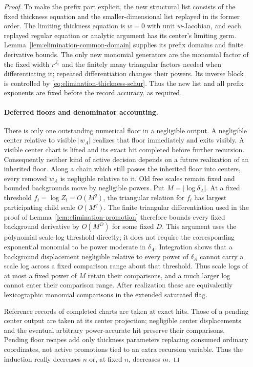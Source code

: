 \begin{proof}
To make the prefix part explicit, the new structural list consists
of the fixed thickness equation and the smaller-dimensional list
replayed in its former order.  The limiting thickness equation is
$w=0$ with unit $w$-Jacobian, and each replayed regular equation or
analytic argument has its center's limiting germ.
Lemma~\ref{lem:elimination-common-domain} supplies its prefix
domains and finite derivative bounds.  The only new monomial
generators are the monomial factor of the fixed width $r^{J_0}$ and
the finitely many triangular factors needed when differentiating it; repeated
differentiation changes their powers.  Its inverse block is
controlled by \eqref{eq:elimination-thickness-schur}.
Thus the new list and all prefix exponents are fixed before the
record accuracy, as required.

\paragraph{Deferred floors and denominator accounting.}
There is only one outstanding numerical floor in a negligible
output.  A negligible center relative to visible $|w_A|$ realizes
that floor immediately and exits visibly.  A visible center chart
is lifted and its exact hit completed before further recursion.
Consequently neither kind of active decision depends on a future
realization of an inherited floor.  Along a chain which still passes
the inherited floor into centers, every removed $w_A$ is negligible
relative to it.  Old free scales remain fixed and bounded backgrounds
move by negligible powers.  Put $M=|\log\delta_A|$.  At a fixed
threshold $f_i=\log Z_i=O(M^q)$, the triangular relation for $f_i$
has largest participating child scale $O(M^q)$.  The finite triangular
differentiation used in the proof of
Lemma~\ref{lem:elimination-promotion} therefore bounds every fixed
background derivative by $O(M^D)$ for some fixed $D$.  This argument
uses the polynomial scale-log threshold directly; it does not require
the corresponding exponential monomial to be power moderate in
$\delta_A$.  Integration shows that a background displacement
negligible relative to every power of $\delta_A$ cannot carry a scale
log across a fixed comparison range about that threshold.  Thus scale
logs of at most a fixed power of $M$ retain their comparisons, and a
much larger log cannot enter their comparison range.  After realization
these are equivalently lexicographic monomial comparisons in the
extended saturated flag.

Reference records of completed charts are taken at exact hits.
Those of a pending center output are taken at its center projection;
negligible center displacements and the eventual arbitrary
power-accurate hit preserve their comparisons.  Pending floor
recipes add only thickness parameters replacing consumed ordinary
coordinates, not active promotions tied to an extra recursion
variable.  Thus the induction really decreases $n$ or, at fixed $n$,
decreases $m$.


\end{proof}
